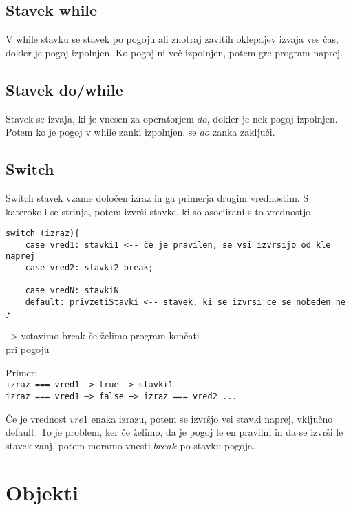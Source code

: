 \subsection{Stavek while}

{\centering{}\par}

V while stavku se stavek po pogoju ali znotraj zavitih oklepajev izvaja ves čas, dokler je pogoj izpolnjen. Ko pogoj ni več izpolnjen, potem gre program naprej.

\pagebreak

\subsection{Stavek do/while}

{\centering{}\par}

Stavek se izvaja, ki je vnesen za operatorjem $do$, dokler je nek pogoj izpolnjen. Potem ko je pogoj v while zanki izpolnjen, se $do$ zanka zaključi.

\subsection{Switch}
Switch stavek vzame določen izraz in ga primerja drugim vrednostim. S katerokoli se strinja, potem izvrši stavke, ki so asociirani s to vrednostjo.
\begin{verbatim}
switch (izraz){
    case vred1: stavki1 <-- če je pravilen, se vsi izvrsijo od kle naprej
    case vred2: stavki2 break;
    
    case vredN: stavkiN
    default: privzetiStavki <-- stavek, ki se izvrsi ce se nobeden ne
}
\end{verbatim}
 --> vstavimo break če želimo program končati\\ pri pogoju

Primer:\\
\texttt{izraz === vred1 --> true --> stavki1}\\
\texttt{izraz === vred1 --> false --> izraz === vred2 ...}

Če je vrednost $vre1$ enaka izrazu, potem se izvršjo vsi stavki naprej, vključno default. To je problem, ker če želimo, da je pogoj le en pravilni in da se izvrši le stavek zanj, potem moramo vnesti $break$ po stavku pogoja.
\newpage
\section{Objekti}

